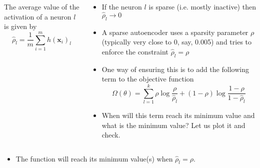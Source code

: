 \begin{frame}
  \begin{columns}
    \begin{overlayarea}{\textwidth}{\textheight}
        \vspace{-0.2cm}
        
        The average value of the activation of a neuron $l$ is given by
        \[ 
            \hat{\rho}_l = \frac{1}{m}\sum_{i=1}^m h(\textbf{x}_i)_l
        \]
    \end{overlayarea}

    \begin{overlayarea}{\textwidth}{\textheight}
        \begin{itemize}\justifying
            \item<1-> If the neuron $l$ is sparse (i.e. mostly inactive) then $\hat{\rho}_{l} \rightarrow 0$
            \item<2->A sparse autoencoder uses  a sparsity parameter $\rho$ (typically very close to 0, say, 0.005) and tries to enforce the constraint $\hat{\rho}_{l} = \rho$
            \item<3-> One way of ensuring this is to add the following term to the objective function\\
                \[
                    \Omega(\theta) = 
                        \sum_{l=1}^k \rho \log \frac{\rho}{\hat{\rho}_l} + 
                        (1-\rho) \log \frac{1-\rho}{1-\hat{\rho}_{l}}
                \]
            \item<4->When will this term reach its minimum value and what is the minimum value? Let us plot it and check.
        \end{itemize}
    \end{overlayarea}
  \end{columns}
\end{frame}

\begin{frame}
	
    \begin{itemize}\justifying
        \item<2-> The function will reach its minimum value(s) when $\hat{\rho}_{l} = \rho$.
    
\end{itemize}
\end{frame}

